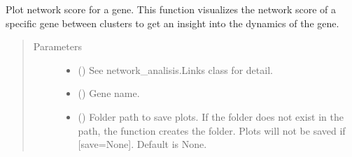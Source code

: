 \documentclass[letterpaper,10pt,english]{sphinxmanual}
\begin{document}
\begin{fulllineitems}
\begin{fulllineitems}
\begin{quote}
\begin{description}
\begin{itemize}
\end{itemize}

\end{description}\end{quote}

\end{fulllineitems}


\begin{fulllineitems}
\label{\detokenize{modules/celloracle:celloracle.Links.plot_score_per_cluster}}
Plot network score for a gene.
This function visualizes the network score of a specific gene between clusters to get an insight into the dynamics of the gene.
\begin{quote}\begin{description}
\item[{Parameters}] \leavevmode\begin{itemize}
\item {} 
 ({\hyperref[\detokenize{modules/celloracle:celloracle.Links}]{}}) \textendash{} See network\_analisis.Links class for detail.

\item {} 
 () \textendash{} Gene name.

\item {} 
 () \textendash{} Folder path to save plots. If the folder does not exist in the path, the function creates the folder.
Plots will not be saved if {[}save=None{]}. Default is None.

\end{itemize}

\end{description}\end{quote}

\end{fulllineitems}



\end{fulllineitems}
\end{document}
